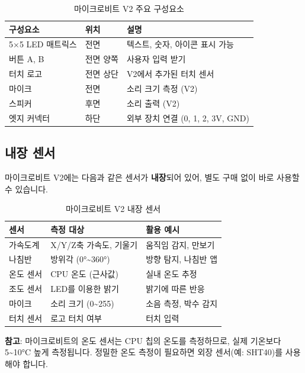 \documentclass[11pt, a4paper]{article}
\begin{document}
\begin{table}[H]
\centering
\begin{tabularx}{\textwidth}{l l X}
\toprule
\textbf{구성요소} & \textbf{위치} & \textbf{설명} \\
\midrule
5×5 LED 매트릭스 & 전면 & 텍스트, 숫자, 아이콘 표시 가능 \\
버튼 A, B & 전면 양쪽 & 사용자 입력 받기 \\
터치 로고 & 전면 상단 & V2에서 추가된 터치 센서 \\
마이크 & 전면 & 소리 크기 측정 (V2) \\
스피커 & 후면 & 소리 출력 (V2) \\
엣지 커넥터 & 하단 & 외부 장치 연결 (0, 1, 2, 3V, GND) \\
\bottomrule
\end{tabularx}
\caption{마이크로비트 V2 주요 구성요소}
\end{table}

\subsection{내장 센서}

마이크로비트 V2에는 다음과 같은 센서가 \textbf{내장}되어 있어, 별도 구매 없이 바로 사용할 수 있습니다.

\begin{table}[H]
\centering
\begin{tabularx}{\textwidth}{l l X}
\toprule
\textbf{센서} & \textbf{측정 대상} & \textbf{활용 예시} \\
\midrule
가속도계 & X/Y/Z축 가속도, 기울기 & 움직임 감지, 만보기 \\
나침반 & 방위각 (0°\textasciitilde360°) & 방향 탐지, 나침반 앱 \\
온도 센서 & CPU 온도 (근사값) & 실내 온도 추정 \\
조도 센서 & LED를 이용한 밝기 & 밝기에 따른 반응 \\
마이크 & 소리 크기 (0\textasciitilde255) & 소음 측정, 박수 감지 \\
터치 센서 & 로고 터치 여부 & 터치 입력 \\
\bottomrule
\end{tabularx}
\caption{마이크로비트 V2 내장 센서}
\end{table}

\begin{info}
\textbf{참고}: 마이크로비트의 온도 센서는 CPU 칩의 온도를 측정하므로, 실제 기온보다 5\textasciitilde10°C 높게 측정됩니다. 정밀한 온도 측정이 필요하면 외장 센서(예: SHT40)를 사용해야 합니다.
\end{info}
\end{document}
